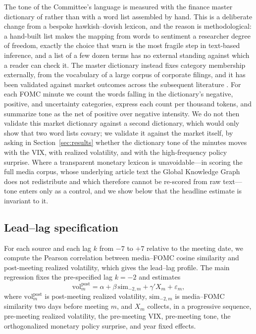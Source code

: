\documentclass[11pt,a4paper]{article}
\newcommand{\simk}[1]{\ensuremath{\mathrm{sim}_{#1}}}
\begin{document}
The tone of the Committee's language is measured with the finance master
dictionary of \citet{loughran2011liability} rather than with a word list assembled
by hand. This is a deliberate change from a bespoke hawkish--dovish lexicon, and the
reason is methodological: a hand-built list makes the mapping from words to
sentiment a researcher degree of freedom, exactly the choice that
\citet{gentzkow2019text} warn is the most fragile step in text-based inference, and
a list of a few dozen terms has no external standing against which a reader can
check it. The master dictionary instead fixes category membership externally, from
the vocabulary of a large corpus of corporate filings, and it has been validated
against market outcomes across the subsequent literature \citep{loughran2020textual}.
For each FOMC minute we count the words falling in the dictionary's negative,
positive, and uncertainty categories, express each count per thousand tokens, and
summarize tone as the net of positive over negative intensity. We do not then
validate this market dictionary against a second dictionary, which would only show
that two word lists covary; we validate it against the market itself, by asking in
Section~\ref{sec:results} whether the dictionary tone of the minutes moves with the
VIX, with realized volatility, and with the high-frequency policy surprise. Where a
transparent monetary lexicon is unavoidable---in scoring the full media corpus,
whose underlying article text the Global Knowledge Graph does not redistribute and
which therefore cannot be re-scored from raw text---tone enters only as a control,
and we show below that the headline estimate is invariant to it.

\subsection{Lead--lag specification}

For each source and each lag $k$ from $-7$ to $+7$ relative to the meeting date, we
compute the Pearson correlation between media--FOMC cosine similarity and
post-meeting realized volatility, which gives the lead--lag profile. The main
regression fixes the pre-specified lag $k=-2$ and estimates
%
\begin{equation}
\mathrm{vol}^{\text{post}}_{m}
= \alpha + \beta\,\simk{-2,m} + \gamma' X_{m} + \varepsilon_{m},
\label{eq:main}
\end{equation}
%
where $\mathrm{vol}^{\text{post}}_{m}$ is post-meeting realized volatility,
$\simk{-2,m}$ is media--FOMC similarity two days before meeting $m$, and $X_m$
collects, in a progressive sequence, pre-meeting realized volatility, the
pre-meeting VIX, pre-meeting tone, the orthogonalized monetary policy surprise, and
year fixed effects.
\end{document}
